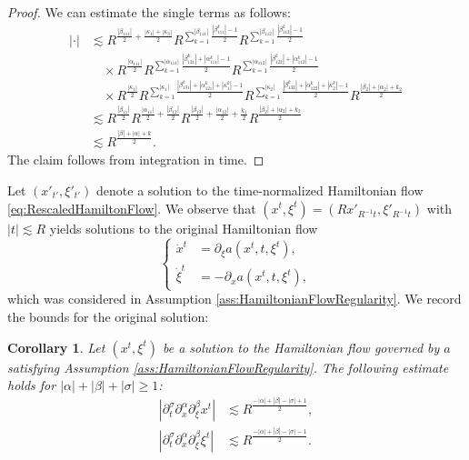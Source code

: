 \documentclass{amsart}
\newtheorem{corollary}[theorem]{Corollary}
\theoremstyle{definition}
\begin{document}
\begin{proof}
We can estimate the single terms as follows:
\begin{equation*}
\begin{split}
| \cdot | &\lesssim R^{\frac{|\beta_{111}|}{2} + \frac{|\kappa_1|+ |\kappa_3|}{2}} R^{\sum_{k=1}^{|\beta_{111}|} \frac{|\beta_{111}^k|-1}{2}} R^{\sum_{k=1}^{|\beta_{112}|} \frac{|\beta_{112}^k| - 1}{2}} \\
&\quad  \times R^{\frac{|\alpha_{111}|}{2}} R^{\sum_{k=1}^{|\alpha_{111}|} \frac{|\beta_{121}^k| + |\alpha_{111}^k| - 1}{2}} R^{\sum_{k=1}^{|\alpha_{112}|} \frac{|\beta_{122}^k| + |\alpha_{112}^k| - 1}{2}} \\
&\quad \times R^{\frac{|\kappa_1|}{2}} R^{\sum_{k=1}^{|\kappa_1|} \frac{|\beta_{131}^k| + |\alpha_{121}^k| + |\kappa_1^k| - 1}{2}} R^{\sum_{k=1}^{|\kappa_2|} \frac{|\beta_{132}^k| + |\alpha_{122}^k| + |\kappa_2^k| - 1}{2}} R^{\frac{|\beta_2| + |\alpha_2| + k_2}{2}} \\
&\lesssim R^{\frac{|\beta_{11}|}{2}} R^{\frac{|\alpha_{11}|}{2} + \frac{|\beta_{12}|}{2}} R^{\frac{|\beta_{13}|}{2} + \frac{|\alpha_{12}|}{2} + \frac{k_1}{2}} R^{\frac{|\beta_2| + |\alpha_2| + k_2}{2}} \\
&\lesssim R^{\frac{|\beta| + |\alpha| + k}{2}}.
\end{split}
\end{equation*}
The claim follows from integration in time.
\end{proof}

Let $(x'_{t'},\xi'_{t'})$ denote a solution to the time-normalized Hamiltonian flow \eqref{eq:RescaledHamiltonFlow}. We observe that $(x^t,\xi^t) = (R x'_{R^{-1} t}, \xi'_{R^{-1} t})$ with $|t| \lesssim R$ yields solutions to the original Hamiltonian flow
\begin{equation*}
\left\{ \begin{array}{cl}
\dot{x}^t &= \partial_{\xi} a(x^t,t, \xi^t), \\
\dot{\xi}^t &= - \partial_x a( x^t,t,\xi^t),
\end{array} \right.
\end{equation*}
which was considered in Assumption \ref{ass:HamiltonianFlowRegularity}. We record the bounds for the original solution:
\begin{corollary}
Let $(x^t,\xi^t)$ be a solution to the Hamiltonian flow governed by $a$ satisfying Assumption \ref{ass:HamiltonianFlowRegularity}. The following estimate holds for $|\alpha| + |\beta| + |\sigma| \geq 1$:
\begin{equation}
\label{eq:RegularityOriginalHamiltonFlow}
\begin{split}
|\partial_t^{\sigma} \partial_x^{\alpha} \partial_{\xi}^{\beta} x^t|  &\lesssim R^{\frac{-|\alpha| + |\beta| - |\sigma| + 1}{2}}, \\
|\partial_t^{\sigma} \partial_x^{\alpha} \partial_{\xi}^{\beta} \xi^t| &\lesssim R^{\frac{-|\alpha|+|\beta|-|\sigma|-1}{2}}.
\end{split}
\end{equation}
\end{corollary}
\end{document}
